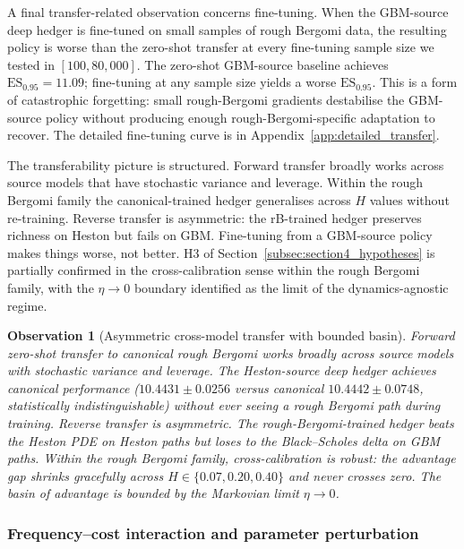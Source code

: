 \documentclass[12pt,a4paper]{article}
\theoremstyle{definition}
\theoremstyle{plain}
\theoremstyle{remark}
\theoremstyle{plain}
\newtheorem{observation}{Observation}[section]
\begin{document}
A final transfer-related observation concerns fine-tuning. When the
GBM-source deep hedger is fine-tuned on small samples of rough Bergomi
data, the resulting policy is worse than the zero-shot transfer at
every fine-tuning sample size we tested in $[100, 80{,}000]$. The
zero-shot GBM-source baseline achieves
$\mathrm{ES}_{0.95} = 11.09$; fine-tuning at any sample size yields a
worse $\mathrm{ES}_{0.95}$. This is a form of catastrophic forgetting:
small rough-Bergomi gradients destabilise the GBM-source policy
without producing enough rough-Bergomi-specific adaptation to recover.
The detailed fine-tuning curve is in
Appendix~\ref{app:detailed_transfer}.

The transferability picture is structured. Forward transfer broadly
works across source models that have stochastic variance and leverage.
Within the rough Bergomi family the canonical-trained hedger
generalises across $H$ values without re-training. Reverse transfer
is asymmetric: the rB-trained hedger preserves richness on Heston but
fails on GBM. Fine-tuning from a GBM-source policy makes things
worse, not better. H3 of Section~\ref{subsec:section4_hypotheses} is
partially confirmed in the cross-calibration sense within the rough
Bergomi family, with the $\eta \to 0$ boundary identified as the limit
of the dynamics-agnostic regime.

\begin{observation}[Asymmetric cross-model transfer with bounded basin]
\label{obs:6_4_transfer}
Forward zero-shot transfer to canonical rough Bergomi works broadly
across source models with stochastic variance and leverage. The
Heston-source deep hedger achieves canonical performance
($10.4431 \pm 0.0256$ versus canonical $10.4442 \pm 0.0748$,
statistically indistinguishable) without ever seeing a rough Bergomi
path during training. Reverse transfer is asymmetric. The
rough-Bergomi-trained hedger beats the Heston PDE on Heston paths
but loses to the Black--Scholes delta on GBM paths. Within the rough
Bergomi family, cross-calibration is robust: the advantage gap
shrinks gracefully across $H \in \{0.07, 0.20, 0.40\}$ and never
crosses zero. The basin of advantage is bounded by the Markovian
limit $\eta \to 0$.
\end{observation}

\subsubsection{Frequency--cost interaction and parameter perturbation}
\label{sec:6_3_5}
\end{document}
